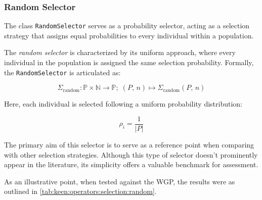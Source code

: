 \subsubsection{Random Selector}
\label{sec:keen:operators:selection:random}
  The class \texttt{RandomSelector} serves as a probability selector, acting 
  as a selection strategy that assigns equal probabilities to every 
  individual within a population.
  
  \begin{definition}
  \label{def:keen:operators:selection:random}
    The \emph{random selector} is characterized by its uniform approach, where every individual in the population is assigned the same selection probability.
    Formally, the \texttt{RandomSelector} is articulated as:
    
    \begin{equation}
      \Sigma_{\mathrm{random}} : 
        \mathbb{P} \times \mathbb{N} \to \mathbb{P};\; 
      (P,\, n) \mapsto \Sigma_{\mathrm{random}}(P,\, n)  
    \end{equation}
    
    Here, each individual is selected following a uniform probability 
    distribution:
    
    \begin{equation}
      \rho_i = \frac{1}{|P|}
    \end{equation}
  \end{definition}
  
  The primary aim of this selector is to serve as a reference point when 
  comparing with other selection strategies.
  Although this type of selector doesn't prominently appear in the 
  literature, its simplicity offers a valuable benchmark for assessment.
  
  As an illustrative point, when tested against the WGP, the results were as 
  outlined in \vref{tab:keen:operators:selection:random}.
